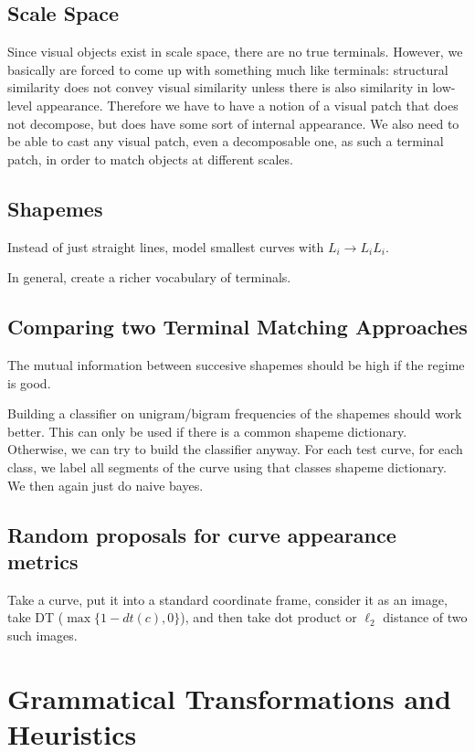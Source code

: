 \documentclass{article}
\begin{document}
\subsection{Scale Space}
Since visual objects exist in scale space, there are no true
terminals. However, we basically are forced to come up with something
much like terminals: structural similarity does not convey visual
similarity unless there is also similarity in low-level
appearance. Therefore we have to have a notion of a visual patch that
does not decompose, but does have some sort of internal appearance. We
also need to be able to cast any visual patch, even a decomposable
one, as such a terminal patch, in order to match objects at different scales.

\subsection{Shapemes}
Instead of just straight lines, model smallest curves with $L_i\to L_i
L_i$.

In general, create a richer vocabulary of terminals.

\subsection{Comparing two Terminal Matching Approaches}

The mutual information between succesive shapemes should be high if
the regime is good.

Building a classifier on unigram/bigram frequencies of the shapemes
should work better. This can only be used if there is a common shapeme
dictionary. Otherwise, we can try to build the classifier anyway. For
each test curve, for each class, we label all segments of the curve
using that classes shapeme dictionary. We then again just do naive
bayes.

\subsection{Random proposals for curve appearance metrics}
\bitem
\item Take a curve, put it into a standard coordinate frame, consider
  it as an image, take DT ($\max \{1-dt(c), 0\}$), and then take dot
  product or $\ell_2$ distance of two such images.

 \eitem


\section{Grammatical Transformations and Heuristics}
\end{document}
